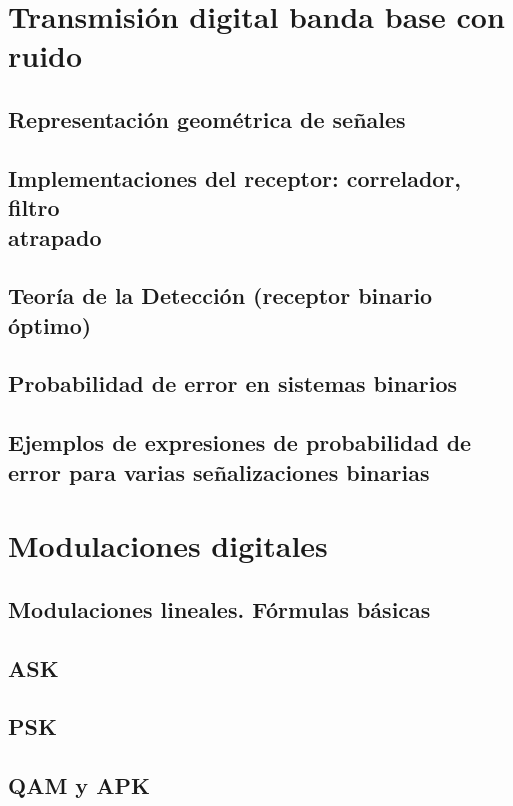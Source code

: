 \documentclass[a4paper]{book}
\begin{document}
\chapter{Transmisión digital banda base con ruido}
\section{Representación geométrica de señales}
\section{\texorpdfstring{Implementaciones del receptor: correlador, filtro\\ atrapado}{Implementaciones del receptor: correlador, filtro atrapado}}
\section{Teoría de la Detección (receptor binario óptimo)}
\section{Probabilidad de error en sistemas binarios}
\section[\texorpdfstring{Ejemplos de expresiones de probabilidad de error para varias\\ señalizaciones binarias}{Ejemplos de expresiones de probabilidad de error para varias señalizaciones binarias}]{Ejemplos de expresiones de probabilidad de error para varias señalizaciones binarias}

\chapter{Modulaciones digitales}
\section{Modulaciones lineales. Fórmulas básicas}
\section{ASK}
\section{PSK}
\section{QAM y APK}
\end{document}
